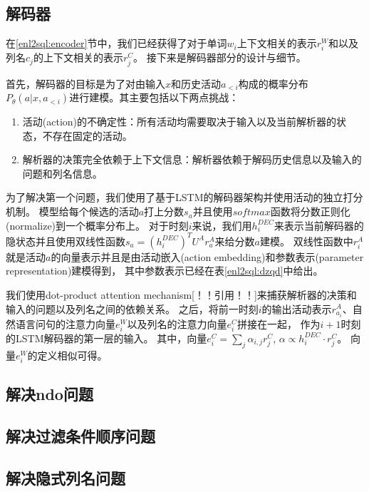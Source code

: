 \subsection{解码器}
\label{enl2sql:decoder}

在\ref{enl2sql:encoder}节中，我们已经获得了对于单词$w_i$上下文相关的表示$r^W_i$和以及列名$c_j$的上下文相关的表示$r^C_j$。
接下来是解码器部分的设计与细节。

首先，解码器的目标是为了对由输入$x$和历史活动$a_{<i}$构成的概率分布$P_{\theta}(a|x,a_{<i})$进行建模。其主要包括以下两点挑战：
\begin{enumerate}
  \item 活动(action)的不确定性：所有活动均需要取决于输入以及当前解析器的状态，不存在固定的活动。
  \item 解析器的决策完全依赖于上下文信息：解析器依赖于解码历史信息以及输入的问题和列名信息。
\end{enumerate}

为了解决第一个问题，我们使用了基于LSTM的解码器架构并使用活动的独立打分机制。
模型给每个候选的活动$a$打上分数$s_a$并且使用$softmax$函数将分数正则化(normalize)到一个概率分布上。
对于时刻$i$来说，我们用$h^{DEC}_i$来表示当前解码器的隐状态并且使用双线性函数$s_a = (h^{DEC}_i)^T U^A r^A_a$来给分数$a$建模。
双线性函数中$r^A_i$就是活动$a$的向量表示并且是由活动嵌入(action embedding)和参数表示(parameter representation)建模得到，
其中参数表示已经在表\ref{enl2sql:dzqd}中给出。

我们使用dot-product attention mechanism[！！引用！！]来捕获解析器的决策和输入的问题以及列名之间的依赖关系。
之后，将前一时刻$i$的输出活动表示$r^A_{a_i}$、自然语言问句的注意力向量$e^W_i$以及列名的注意力向量$e^C_i$拼接在一起，
作为$i+1$时刻的LSTM解码器的第一层的输入。
其中，向量$e^C_i = \sum_j \alpha_{i,j} r^C_j$,  $\alpha \propto h^{DEC}_i \cdot r^C_j$。
向量$e^W_i$的定义相似可得。



\subsection{解决ndo问题}
\label{enl2sql:ndo}

\subsection{解决过滤条件顺序问题}
\label{enl2sql:om}

\subsection{解决隐式列名问题}
\label{enl2sql:icn}

